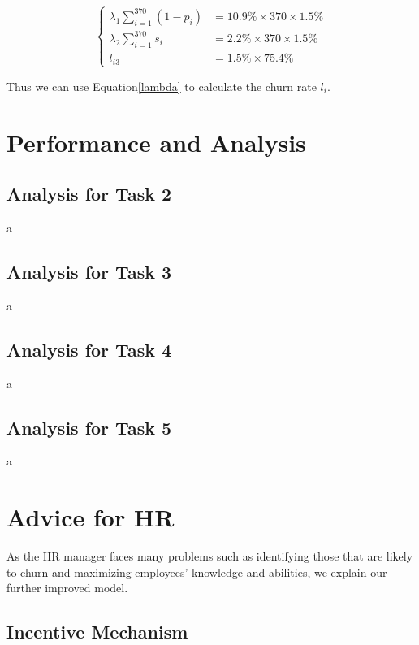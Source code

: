 \documentclass[12pt,a4paper,titlepage]{article}
\begin{document}
\begin{equation}
\label{lambda}
\begin{cases}
  \lambda_1 \sum_{i=1}^{370}(1-p_i) & =10.9\% \times 370 \times 1.5\% \\
  \lambda_2 \sum_{i=1}^{370}s_i & =2.2\% \times 370 \times 1.5\% \\
  l_{i3} & =1.5 \% \times 75.4 \%
\end{cases}
\end{equation}

Thus we can use Equation\ref{lambda} to calculate the churn rate $l_i$.

\section{Performance and Analysis}
\label{sec:performance-and-analysis}

\subsection{Analysis for Task 2}
\label{sec:analysis-for-task-2}

a

\subsection{Analysis for Task 3}
\label{sec:analysis-for-task-3}

a

\subsection{Analysis for Task 4}
\label{sec:analysis-for-task-4}

a

\subsection{Analysis for Task 5}
\label{sec:analysis-for-task-5}
a

\section{Advice for HR}
\label{sec:advice-for-hr}

As the HR manager faces many problems such as identifying those that
are likely to churn and maximizing employees' knowledge and
abilities, we explain our further improved model.

\subsection{Incentive Mechanism}
\label{sec:incentive-machanism}
\end{document}
